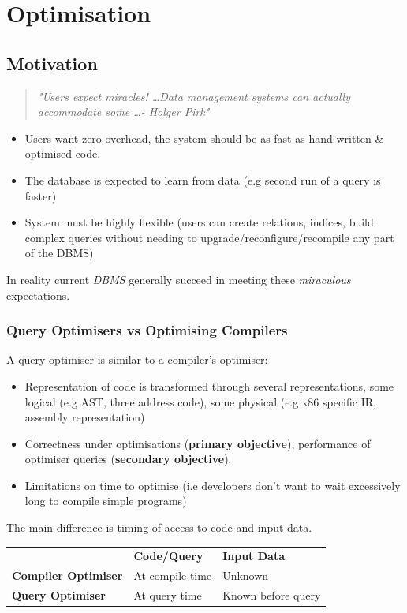 \chapter{Optimisation}
\section{Motivation}
\begin{quote}
    \textit{"Users expect miracles! \dots Data management systems can actually accommodate some \dots - Holger Pirk"}
\end{quote}
\begin{itemize}
    \item Users want zero-overhead, the system should be as fast as hand-written \& optimised code.
    \item The database is expected to learn from data (e.g second run of a query is faster)
    \item System must be highly flexible (users can create relations, indices, build complex queries without needing to upgrade/reconfigure/recompile any part of the DBMS) 
\end{itemize}
In reality current \textit{DBMS} generally succeed in meeting these \textit{miraculous} expectations.

\subsection{Query Optimisers vs Optimising Compilers}
A query optimiser is similar to a compiler's optimiser:
\begin{itemize}
    \item Representation of code is transformed through several representations, some logical (e.g AST, three address code), some physical (e.g x86 specific IR, assembly representation)
    \item Correctness under optimisations (\textbf{primary objective}), performance of optimiser queries (\textbf{secondary objective}).
    \item Limitations on time to optimise (i.e developers don't want to wait excessively long to compile simple programs)
\end{itemize}
The main difference is timing of access to code and input data.
\begin{center}
    \begin{tabular}{l l l}
        & \textbf{Code/Query} & \textbf{Input Data} \\
        \textbf{Compiler Optimiser} & At compile time & Unknown \\
        \textbf{Query Optimiser} & At query time & Known before query \\
    \end{tabular}
\end{center}

